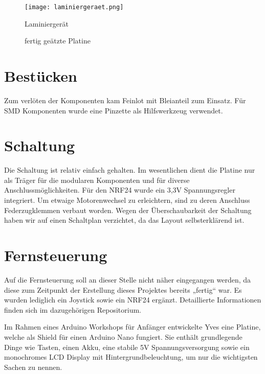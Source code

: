 \documentclass{article}
\begin{document}
\begin{figure}[h]
	\texttt{[image: laminiergeraet.png]}
	\centering
	\caption{Laminiergerät}
\end{figure}

\begin{figure}[h] 
\caption{fertig geätzte Platine} 
\end{figure} 

\newpage
\section{Bestücken}%

Zum verlöten der Komponenten kam Feinlot mit Bleianteil zum Einsatz.
Für SMD Komponenten wurde eine Pinzette als Hilfswerkzeug verwendet.

\section{Schaltung}%

Die Schaltung ist relativ einfach gehalten. Im wesentlichen dient die Platine nur als Träger für die modularen Komponenten und für diverse Anschlussmöglichkeiten. Für den NRF24 wurde ein 3,3V Spannungsregler integriert.
Um etwaige Motorenwechsel zu erleichtern, sind zu deren Anschluss Federzugklemmen verbaut worden.
Wegen der Überschaubarkeit der Schaltung haben wir auf einen Schaltplan verzichtet, da das Layout selbsterklärend ist.

\section{Fernsteuerung}%

Auf die Fernsteuerung soll an dieser Stelle nicht näher eingegangen werden, da diese zum Zeitpunkt der Erstellung dieses Projektes bereits „fertig“ war.
Es wurden lediglich ein Joystick sowie ein NRF24 ergänzt.
Detaillierte Informationen finden sich im dazugehörigen Repositorium.

Im Rahmen eines Arduino Workshops für Anfänger entwickelte Yves eine Platine, welche als Shield für einen Arduino Nano fungiert. Sie enthält grundlegende Dinge wie Tasten, einen Akku, eine stabile 5V Spannungsversorgung sowie ein monochromes LCD Display mit Hintergrundbeleuchtung, um nur die wichtigsten Sachen zu nennen.
\end{document}
